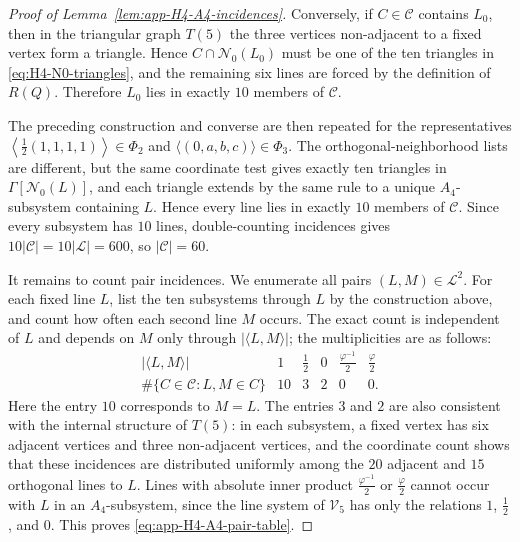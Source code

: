 \documentclass[10pt,a4paper]{amsart}
\begin{document}
\begin{proof}[Proof of Lemma~\ref{lem:app-H4-A4-incidences}]
Conversely, if \(C\in\mathcal C\) contains \(L_{0}\), then in the triangular
graph \(T(5)\) the three vertices non-adjacent to a fixed vertex form a
triangle.  Hence \(C\cap\mathcal N_{0}(L_{0})\) must be one of the ten
triangles in \eqref{eq:H4-N0-triangles}, and the remaining six lines are
forced by the definition of \(R(Q)\).  Therefore \(L_{0}\) lies in exactly
\(10\) members of \(\mathcal C\).

The preceding construction and converse are then repeated for the
representatives
\(\left\langle\frac{1}{2}(1,1,1,1)\right\rangle\in\Phi_{2}\) and
\(\langle(0,a,b,c)\rangle\in\Phi_{3}\).  The
orthogonal-neighborhood lists are different, but the same coordinate test
gives exactly ten triangles in \(\Gamma[\mathcal N_{0}(L)]\), and each
triangle extends by the same rule to a unique \(A_{4}\)-subsystem
containing \(L\).  Hence every line lies in exactly \(10\) members of
\(\mathcal C\).  Since every subsystem has \(10\) lines,
double-counting incidences gives \(10|\mathcal C|=10|\mathcal L|=600\),
so \(|\mathcal C|=60\).

It remains to count pair incidences.  We enumerate all pairs
\((L,M)\in\mathcal L^{2}\).  For each fixed line \(L\), list the ten
subsystems through \(L\) by the construction above, and count how often
each second line \(M\) occurs.  The exact count is independent of \(L\) and
depends on \(M\) only through \(|\langle L,M\rangle|\); the multiplicities
are as follows:
\[
\begin{array}{c|ccccc}
|\langle L,M\rangle|
& 1 & \frac{1}{2} & 0 & \frac{\varphi^{-1}}{2} & \frac{\varphi}{2}\\
\hline
\#\{C\in\mathcal C:L,M\in C\}
&10&3&2&0&0 .
\end{array}
\]
Here the entry \(10\) corresponds to \(M=L\).  The entries \(3\) and \(2\)
are also consistent with the internal structure of \(T(5)\): in each
subsystem, a fixed vertex has six adjacent vertices and three non-adjacent
vertices, and the coordinate count shows that these incidences are
distributed uniformly among the \(20\) adjacent and \(15\) orthogonal lines
to \(L\).  Lines with absolute inner product \(\frac{\varphi^{-1}}{2}\) or
\(\frac{\varphi}{2}\) cannot occur with \(L\) in an \(A_{4}\)-subsystem, since the
line system of \(\mathcal V_{5}\) has only the relations \(1\),
\(\frac{1}{2}\), and \(0\).
This proves \eqref{eq:app-H4-A4-pair-table}.
\end{proof}
\end{document}
